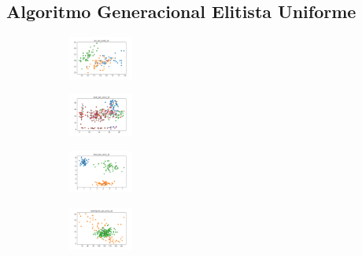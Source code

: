 
\subsection{Algoritmo Generacional Elitista Uniforme}

\vspace*{\fill}

\begin{figure}[H]    
    \centering
    \begin{subfigure}
        \centering
        \includegraphics[width=0.234\textwidth]{img/aggun/iris_set_const_10_949004259_clust.png}
    \end{subfigure}
    \hfill
    \begin{subfigure}
        \centering
        \includegraphics[width=0.234\textwidth]{img/aggun/ecoli_set_const_10_949004259_clust.png}
    \end{subfigure}
    \hfill
    \begin{subfigure}
        \centering
        \includegraphics[width=0.234\textwidth]{img/aggun/rand_set_const_10_949004259_clust.png}
    \end{subfigure}
    \hfill
    \begin{subfigure}
        \centering
        \includegraphics[width=0.234\textwidth]{img/aggun/newthyroid_set_const_10_949004259_clust.png}

\end{subfigure}
\end{figure}
